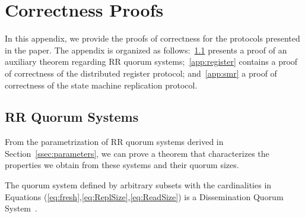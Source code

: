 \chapter{Correctness Proofs}\label{chapter:appendixA}

In this appendix, we provide the proofs of correctness for the
protocols presented in the paper. The appendix is organized as
follows:~\ref{app:quorum} presents a proof of an auxiliary
theorem regarding \ac{RR} quorum systems;~\ref{app:register}
contains a proof of correctness of the distributed register
protocol; and~\ref{app:smr} a proof of correctness of the state
machine replication protocol.

\section{\ac{RR} Quorum Systems}\label{app:quorum}

From the parametrization of \ac{RR} quorum systems derived
in Section~\ref{ssec:parameters}, we can prove a theorem that
characterizes the properties we obtain from these systems and
their quorum sizes.

\begin{theorem}\label{thrmQ}
  The quorum system defined by arbitrary subsets with the
    cardinalities in Equations
    (\ref{eq:fresh},\ref{eq:ReplSize},\ref{eq:ReadSize}) is a
    Dissemination Quorum System~\cite{Malkhi:Reiter:BQS:98}.
\end{theorem}

